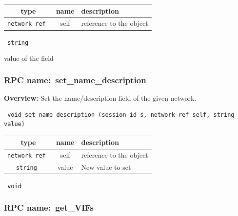 
 
\vspace{0.3cm}
\begin{tabular}{|c|c|p{7cm}|}
 \hline
{\bf type} & {\bf name} & {\bf description} \\ \hline
{\tt network ref } & self & reference to the object \\ \hline 

\end{tabular}

\vspace{0.3cm}

{\tt 
string
}


value of the field
\vspace{0.3cm}
\vspace{0.3cm}
\vspace{0.3cm}
\subsubsection{RPC name:~set\_name\_description}

{\bf Overview:} 
Set the name/description field of the given network.

\begin{verbatim} void set_name_description (session_id s, network ref self, string value)\end{verbatim}



 
\vspace{0.3cm}
\begin{tabular}{|c|c|p{7cm}|}
 \hline
{\bf type} & {\bf name} & {\bf description} \\ \hline
{\tt network ref } & self & reference to the object \\ \hline 

{\tt string } & value & New value to set \\ \hline 

\end{tabular}

\vspace{0.3cm}

{\tt 
void
}



\vspace{0.3cm}
\vspace{0.3cm}
\vspace{0.3cm}
\subsubsection{RPC name:~get\_VIFs}

